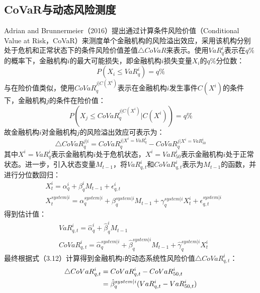 \documentclass[lang=cn]{elegantpaper}
\begin{document}
\subsection{CoVaR与动态风险测度}
Adrian and Brunnermeier（2016）提出通过计算条件风险价值（Conditional Value at Risk，CoVaR）来测度单个金融机构的风险溢出效应，采用该机构分别处于危机和正常状态下的条件风险价值差值$\bigtriangleup CoVaR$来表示。使用$VaR_q^i$表示在$q\%$的概率下，金融机构$i$的最大可能损失，即金融机构$i$损失变量$X_i$的$q\%$分位数：
\begin{equation}
    P(X_i\leq VaR_q^i)=q\%
\end{equation}
与在险价值类似，使用$CoVaR_q^{j|C(X^i)}$表示在金融机构$i$发生事件$C(X^i)$的条件下，金融机构$j$的条件在险价值：
\begin{equation}
    P(X_j\leq CoVaR_q^{j|C(X^i)}|C(X^i))=q\%
\end{equation}
故金融机构$i$对金融机构$j$的风险溢出效应可表示为：
\begin{equation}
    \bigtriangleup CoVaR_q^{j|i}=CoVaR_q^{j|X^i=VaR_q^i}-CoVaR_q^{j|X^i=VaR_{50}^i}
\end{equation}
其中$X^i=VaR_q^i$表示金融机构$i$处于危机状态，$X^i=VaR_{50}^i$表示金融机构$i$处于正常状态。进一步，引入状态变量$M_{t-1}$，将$VaR_{q,t}^i$和$CoVaR_{q,t}^i$表示为$M_{t-1}$的函数，并进行分位数回归：
\begin{align}
    &X_t^i=\alpha_q^i+\beta_q^i M_{t-1}+\epsilon_{q,t}^i\\
    &X_t^{system|i}=\alpha_q^{system|i}+\beta_q^{system|i} M_{t-1}+\gamma_q^{system|i} X_t^i+\epsilon_{q,t}^{system|i}
\end{align}
得到估计值：
\begin{align}
    &VaR_{q,t}^i=\hat \alpha_q^i+\hat\beta_q^i M_{t-1}\\
    &CoVaR_{q,t}^i=\hat\alpha_q^{system|i}+\hat\beta_q^{system|i} M_{t-1}+\hat\gamma_q^{system|i} X_t^i
\end{align}
最终根据式（3.12）计算得到金融机构$i$的动态系统性风险价值$\bigtriangleup CoVaR_{q,t}^i$：
\begin{align}
    \bigtriangleup CoVaR_{q,t}^i&=CoVaR_{q,t}^i-CoVaR_{50,t}^i\notag\\
    &=\hat\beta_q^{system|i}(VaR_{q,t}^i-VaR_{50,t}^i)
\end{align}
\end{document}
